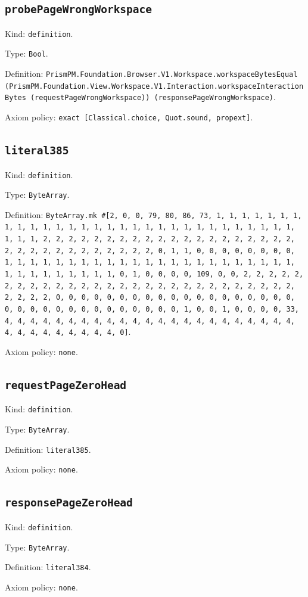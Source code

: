 \documentclass[11pt]{article}
\begin{document}
\subsection*{\texttt{probePageWrongWorkspace}}
\noindent Kind: \texttt{definition}.\par
\noindent Type: \texttt{Bool}.\par
\noindent Definition: \texttt{PrismPM.Foundation.Browser.V1.Workspace.workspaceBytesEqual (PrismPM.Foundation.View.Workspace.V1.Interaction.workspaceInteractionBytes (requestPageWrongWorkspace)) (responsePageWrongWorkspace)}.\par
\noindent Axiom policy: \texttt{exact [Classical.choice, Quot.sound, propext]}.\par
\subsection*{\texttt{literal385}}
\noindent Kind: \texttt{definition}.\par
\noindent Type: \texttt{ByteArray}.\par
\noindent Definition: \texttt{ByteArray.mk \#[2, 0, 0, 79, 80, 86, 73, 1, 1, 1, 1, 1, 1, 1, 1, 1, 1, 1, 1, 1, 1, 1, 1, 1, 1, 1, 1, 1, 1, 1, 1, 1, 1, 1, 1, 1, 1, 1, 1, 1, 2, 2, 2, 2, 2, 2, 2, 2, 2, 2, 2, 2, 2, 2, 2, 2, 2, 2, 2, 2, 2, 2, 2, 2, 2, 2, 2, 2, 2, 2, 2, 2, 0, 1, 1, 0, 0, 0, 0, 0, 0, 0, 0, 1, 1, 1, 1, 1, 1, 1, 1, 1, 1, 1, 1, 1, 1, 1, 1, 1, 1, 1, 1, 1, 1, 1, 1, 1, 1, 1, 1, 1, 1, 1, 1, 0, 1, 0, 0, 0, 0, 109, 0, 0, 2, 2, 2, 2, 2, 2, 2, 2, 2, 2, 2, 2, 2, 2, 2, 2, 2, 2, 2, 2, 2, 2, 2, 2, 2, 2, 2, 2, 2, 2, 2, 2, 0, 0, 0, 0, 0, 0, 0, 0, 0, 0, 0, 0, 0, 0, 0, 0, 0, 0, 0, 0, 0, 0, 0, 0, 0, 0, 0, 0, 0, 0, 0, 0, 0, 1, 0, 0, 1, 0, 0, 0, 0, 33, 4, 4, 4, 4, 4, 4, 4, 4, 4, 4, 4, 4, 4, 4, 4, 4, 4, 4, 4, 4, 4, 4, 4, 4, 4, 4, 4, 4, 4, 4, 4, 4, 0]}.\par
\noindent Axiom policy: \texttt{none}.\par
\subsection*{\texttt{requestPageZeroHead}}
\noindent Kind: \texttt{definition}.\par
\noindent Type: \texttt{ByteArray}.\par
\noindent Definition: \texttt{literal385}.\par
\noindent Axiom policy: \texttt{none}.\par
\subsection*{\texttt{responsePageZeroHead}}
\noindent Kind: \texttt{definition}.\par
\noindent Type: \texttt{ByteArray}.\par
\noindent Definition: \texttt{literal384}.\par
\noindent Axiom policy: \texttt{none}.\par
\end{document}
